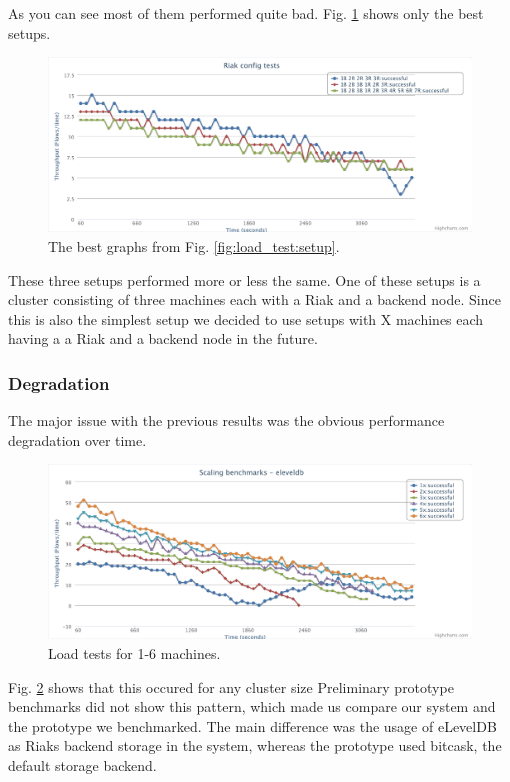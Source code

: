 \documentclass[11pt,a4paper]{report}
\begin{document}
As you can see most of them performed quite bad.
Fig. \ref{fig:load_test:setup2} shows only the best setups.
\begin{figure}[htbp!]
 \hspace{-2.5cm}
 \includegraphics[width=18cm]{./graphics/Load_test-setup2.pdf}
 \caption{The best graphs from Fig. \ref{fig:load_test:setup}.}
 \label{fig:load_test:setup2}
\end{figure}
These three setups performed more or less the same.
One of these setups is a cluster consisting of three machines each with a Riak and a backend node.
Since this is also the simplest setup we decided to use setups with X machines
each having a a Riak and a backend node in the future.


\subsubsection{Degradation}
The major issue with the previous results was the obvious performance degradation over time.
\begin{figure}[htbp!]
 \hspace{-2.5cm}
 \includegraphics[width=18cm]{./graphics/Load_test-degradation.pdf}
 \caption{Load tests for 1-6 machines.}
 \label{fig:load_test:degradation}
\end{figure}
Fig. \ref{fig:load_test:degradation} shows that this occured for any cluster size
Preliminary prototype benchmarks did not show this pattern,
which made us compare our system and the prototype we benchmarked.
The main difference was the usage of eLevelDB as Riaks backend storage in the system,
whereas the prototype used bitcask, the default storage backend.
\end{document}
